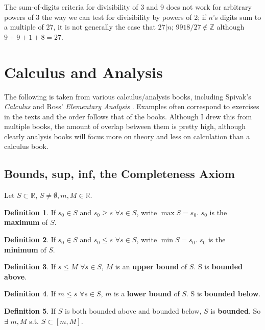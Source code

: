 \documentclass{article}
\theoremstyle{definition}
\newtheorem{definition}{Definition}[section]
\begin{document}
The sum-of-digits criteria for divisibility of 3 and 9 does not work for arbitrary powers of $3$ the way we can test for divisibility by powers of 2; if $n$'s digits sum to a multiple of 27, it is not generally the case that $27|n$; $9918/27 \notin \mathbb{Z}$ although $9 + 9 + 1 + 8 = 27$.

\section{Calculus and Analysis}

The following is taken from various calculus/analysis books, including Spivak's {\it Calculus} \cite{spivak} and Ross' {\it Elementary Analysis} \cite{ross}. Examples often correspond to exercises in the texts and the order follows that of the books. Although I drew this from multiple books, the amount of overlap between them is pretty high, although clearly analysis books will focus more on theory and less on calculation than a calculus book.

\subsection{Bounds, sup, inf, the Completeness Axiom}

Let $S \subset \mathbb{R}$, $S \neq \emptyset, m, M \in \mathbb{R}$. 

\begin{definition}
If $s_0 \in S$ and $s_0 \ge s$ $\forall s \in S$, write $\max S = s_0$. $s_0$ is the \textbf{maximum} of $S$.
\end{definition}

\begin{definition}
If $s_0 \in S$ and $s_0 \le s$ $\forall s \in S$, write $\min S = s_0$. $s_0$ is the \textbf{minimum} of $S$.
\end{definition}

\begin{definition}
If $s \leq M$ $\forall s \in S$, $M$ is an \textbf{upper bound} of $S$. S is \textbf{bounded above}.
\end{definition}

\begin{definition}
If $m \leq s$ $\forall s \in S$, $m$ is a \textbf{lower bound} of $S$. S is \textbf{bounded below}.
\end{definition}

\begin{definition}
If $S$ is both bounded above and bounded below, $S$ is \textbf{bounded}. So $\exists$ $m, M$ s.t. $S \subset [m, M]$.
\end{definition}
\end{document}
